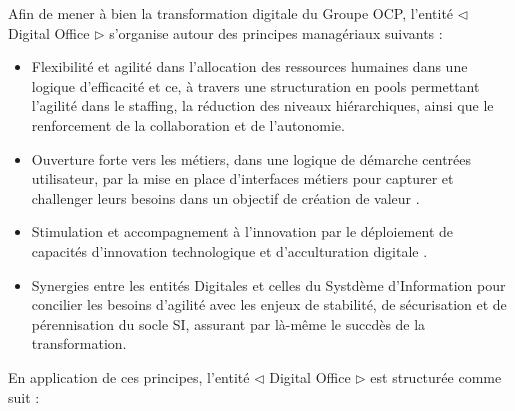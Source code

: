 Afin de mener \`a bien la transformation digitale du Groupe OCP, l'entit\'e ${\triangleleft}$ Digital Office ${\triangleright}$ s'organise autour des principes manag\'eriaux suivants :

\begin{itemize}
\item Flexibilit\'e et agilit\'e dans l'allocation des ressources humaines dans une logique d'efficacit\'e et ce, \`a travers une structuration en pools permettant l'agilit\'e dans le staffing, la r\'eduction des niveaux hi\'erarchiques, ainsi que le renforcement de la collaboration et de l'autonomie.
\item Ouverture forte vers les m\'etiers, dans une logique de d\'emarche centr\'ees utilisateur, par la mise en place d'interfaces m\'etiers pour capturer et challenger leurs besoins dans un objectif de cr\'eation de valeur .
\item Stimulation et accompagnement \`a l'innovation par le d\'eploiement de capacit\'es d'innovation technologique et d'acculturation digitale .
\item Synergies entre les entit\'es Digitales et celles du Systd\`eme d'Information pour concilier les besoins d'agilit\'e avec les enjeux de stabilit\'e, de s\'ecurisation et de p\'erennisation du socle SI, assurant par l\`a-même le succd\`es de la transformation.
\end{itemize}

En application de ces principes, l'entit\'e ${\triangleleft}$  Digital Office ${\triangleright}$ est structur\'ee comme suit :

